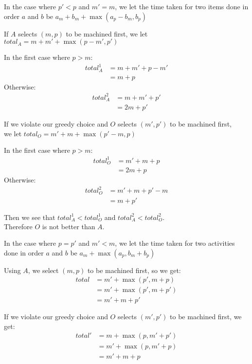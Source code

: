 \documentclass{article}
\begin{document}
In the case where $p' < p$ and $m' = m$, we let the time taken for two items done in order $a$ and $b$ be $a_m + b_m + \max(a_p - b_m, b_p)$

If $A$ selects $(m, p)$ to be machined first, we let $total_A = m + m' + \max(p - m', p')$

In the first case where $p > m$:
\begin{align*}
    total_{A}^1 &= m + m' + p - m'\\
              &= m + p
\end{align*}
Otherwise:
\begin{align*}
    total_{A}^2 &= m + m' + p'\\
              &= 2m + p'
\end{align*}

If we violate our greedy choice and $O$ selects $(m', p')$ to be machined first, \\ we let $total_O = m' + m + \max(p' - m, p)$

In the first case where $p > m$:
\begin{align*}
    total_{O}^1 &= m' + m + p\\
              &= 2m + p
\end{align*}
Otherwise:
\begin{align*}
    total_{O}^2 &= m' + m + p' - m\\
              &= m + p'
\end{align*}

Then we see that $total_{A}^1 < total_{O}^1$ and $total_{A}^2 < total_{O}^2$.\\
Therefore $O$ is not better than $A$.

In the case where $p = p'$ and $m' < m$, we let the time taken for two activities done in order $a$ and $b$ be $a_m + \max(a_p, b_m + b_p)$

Using $A$, we select $(m, p)$ to be machined first, so we get:
\begin{align*}
    total &= m' + \max(p', m + p)\\
          &= m' + \max(p', m + p')\\
          &= m' + m + p'
\end{align*}

If we violate our greedy choice and $O$ selects $(m', p')$ to be machined first, we get:
\begin{align*}
    total' &= m + \max(p, m' + p')\\
           &= m' + \max(p, m' + p)\\
           &= m' + m + p
\end{align*}
\end{document}
